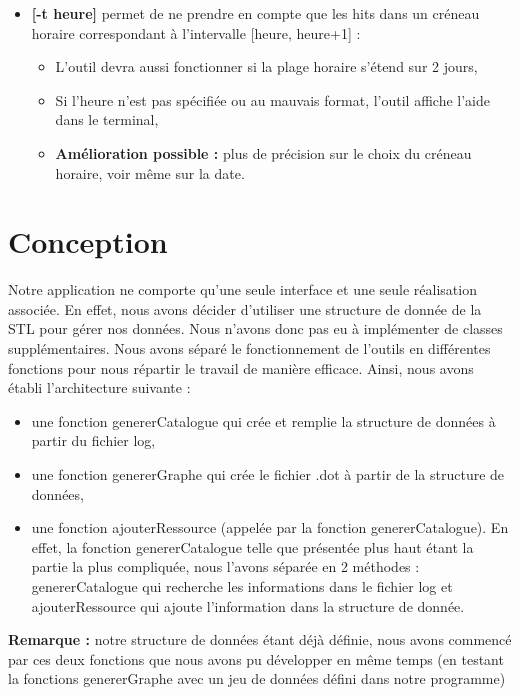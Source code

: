 \documentclass[a4paper]{article}
\begin{document}
\begin{itemize}[label=\textbullet]
		\item{} \textbf{[-t heure]} permet de ne prendre en compte que les hits dans un créneau horaire correspondant à l'intervalle [heure, heure+1] : 
					\begin{itemize}
							\item L'outil devra aussi fonctionner si la plage horaire s'étend sur 2 jours,
							\item Si l'heure n'est pas spécifiée ou au mauvais format, l'outil affiche l'aide dans le terminal,
							\item \textbf{Amélioration possible :} plus de précision sur le choix du créneau horaire, voir même sur la date.
					\end{itemize}
	\end{itemize}
							
\newpage

\section{Conception}\noindent

	Notre application ne comporte qu'une seule interface et une seule réalisation associée. En effet, nous avons décider d'utiliser une structure de donnée de la STL pour gérer nos données. Nous n'avons donc pas eu à implémenter de classes supplémentaires. Nous avons séparé le fonctionnement de l'outils en différentes fonctions pour nous répartir le travail de manière efficace. Ainsi, nous avons établi l'architecture suivante :\\
	\begin{itemize}[label=\textbullet]
		\item une fonction genererCatalogue qui crée et remplie la structure de données à partir du fichier log,
		\item une fonction genererGraphe qui crée le fichier .dot à partir de la structure de données,
		\item une fonction ajouterRessource (appelée par la fonction genererCatalogue). En effet, la fonction genererCatalogue telle que présentée plus haut étant la partie la plus compliquée, nous l'avons séparée en 2 méthodes : genererCatalogue qui recherche les informations dans le fichier log et ajouterRessource qui ajoute l'information dans la structure de donnée.
	\end{itemize}

\bigbreak
\noindent
		\textbf{Remarque :} notre structure de données étant déjà définie, nous avons commencé par ces deux fonctions que nous avons pu développer en même temps (en testant la fonctions genererGraphe avec un jeu de données défini dans notre programme)
	\\
\newpage
\end{document}
